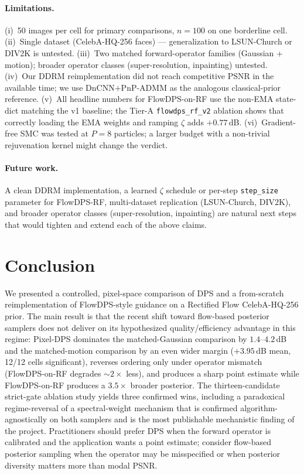 \documentclass{article}
\begin{document}
\paragraph{Limitations.} (i)~50 images per cell for primary
comparisons, $n{=}100$ on one borderline cell. (ii)~Single dataset
(CelebA-HQ-256 faces) — generalization to LSUN-Church or DIV2K is
untested. (iii)~Two matched forward-operator families (Gaussian + motion);
broader operator classes (super-resolution, inpainting) untested.
(iv)~Our DDRM reimplementation did not reach competitive PSNR in the
available time; we use DnCNN$+$PnP-ADMM as the analogous classical-prior
reference. (v)~All headline numbers for FlowDPS-on-RF use the non-EMA
state-dict matching the v1 baseline; the Tier-A
\texttt{flowdps\_rf\_v2} ablation shows that correctly loading the EMA
weights and ramping $\zeta$ adds $+0.77$\,dB. (vi)~Gradient-free SMC
was tested at $P{=}8$ particles; a larger budget with a non-trivial
rejuvenation kernel might change the verdict.

\paragraph{Future work.} A clean DDRM implementation, a learned
$\zeta$ schedule or per-step \texttt{step\_size} parameter for FlowDPS-RF,
multi-dataset replication (LSUN-Church, DIV2K), and broader operator
classes (super-resolution, inpainting) are natural next steps that
would tighten and extend each of the above claims.

\section{Conclusion}

We presented a controlled, pixel-space comparison of DPS and a
from-scratch reimplementation of FlowDPS-style guidance on a Rectified
Flow CelebA-HQ-256 prior. The main result is that the recent shift
toward flow-based posterior samplers does not deliver on its
hypothesized quality/efficiency advantage in this regime: Pixel-DPS
dominates the matched-Gaussian comparison by $1.4$--$4.2$\,dB and the
matched-motion comparison by an even wider margin ($+3.95$\,dB mean,
12/12 cells significant), reverses ordering only under operator
mismatch (FlowDPS-on-RF degrades $\sim 2\times$ less), and produces a
sharp point estimate while FlowDPS-on-RF produces a $3.5\times$ broader
posterior. The thirteen-candidate strict-gate ablation study yields
three confirmed wins, including a paradoxical regime-reversal of a
spectral-weight mechanism that is confirmed algorithm-agnostically on
both samplers and is the most publishable mechanistic finding of the
project. Practitioners should prefer DPS when the forward operator is
calibrated and the application wants a point estimate; consider
flow-based posterior sampling when the operator may be misspecified or
when posterior diversity matters more than modal PSNR.
\end{document}
